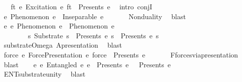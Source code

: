 \begin{isabellebody}
\ \ \ {\isacharparenleft}{\kern0pt}{\isasymforall}ft\ e{\isachardot}{\kern0pt}\ Excitation\ e\ ft\ {\isasymlongrightarrow}\ Presents\ e\ {\isasymOmega}{\isacharparenright}{\kern0pt}{\isachardoublequoteclose}\isanewline
%
\isadelimproof
%
\endisadelimproof
%
\isatagproof
{}\isamarkupfalse%
\ {\isacharparenleft}{\kern0pt}intro\ conjI{\isacharparenright}{\kern0pt}\isanewline
\ \ \isamarkupfalse%
\ {\isachardoublequoteopen}{\isasymforall}e{\isachardot}{\kern0pt}\ Phenomenon\ e\ {\isasymlongrightarrow}\ Inseparable\ e\ {\isasymOmega}{\isachardoublequoteclose}\isanewline
\ \ \ \ \isamarkupfalse%
\ Nonduality\ \isamarkupfalse%
\ blast\isanewline
{}\isamarkupfalse%
\isanewline
\ \ \isamarkupfalse%
\ {\isachardoublequoteopen}{\isasymforall}e{}\ e{}{\isachardot}{\kern0pt}\ Phenomenon\ e{}\ {\isasymand}\ Phenomenon\ e{}\ {\isasymlongrightarrow}\isanewline
\ \ \ \ \ \ \ \ {\isacharparenleft}{\kern0pt}{\isasymexists}s{\isachardot}{\kern0pt}\ Substrate\ s\ {\isasymand}\ Presents\ e{}\ s\ {\isasymand}\ Presents\ e{}\ s{\isacharparenright}{\kern0pt}{\isachardoublequoteclose}\isanewline
\ \ \ \ \isamarkupfalse%
\ substrate{\isacharunderscore}{\kern0pt}Omega\ A{}{\isacharunderscore}{\kern0pt}presentation\ \isamarkupfalse%
\ blast\isanewline
{}\isamarkupfalse%
\isanewline
\ \ \isamarkupfalse%
\ {\isachardoublequoteopen}{\isasymforall}force\ e{\isachardot}{\kern0pt}\ ForcePresentation\ e\ force\ {\isasymlongrightarrow}\ Presents\ e\ {\isasymOmega}{\isachardoublequoteclose}\isanewline
\ \ \ \ \isamarkupfalse%
\ F{}{\isacharunderscore}{\kern0pt}forces{\isacharunderscore}{\kern0pt}via{\isacharunderscore}{\kern0pt}presentation\ \isamarkupfalse%
\ blast\isanewline
{}\isamarkupfalse%
\isanewline
\ \ \isamarkupfalse%
\ {\isachardoublequoteopen}{\isasymforall}e{}\ e{}{\isachardot}{\kern0pt}\ Entangled\ e{}\ e{}\ {\isasymlongrightarrow}\ Presents\ e{}\ {\isasymOmega}\ {\isasymand}\ Presents\ e{}\ {\isasymOmega}{\isachardoublequoteclose}\isanewline
\ \ \ \ \isamarkupfalse%
\ ENT{}{\isacharunderscore}{\kern0pt}substrate{\isacharunderscore}{\kern0pt}unity\ \isamarkupfalse%
\ blast\isanewline
{}\isamarkupfalse%

\end{isabellebody}
